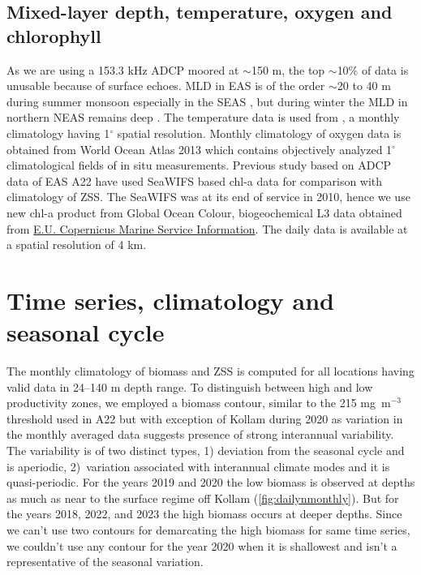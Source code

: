 \documentclass{article}
\begin{document}
	\subsection{Mixed-layer depth, temperature, oxygen and chlorophyll}
	As we are using a 153.3 kHz ADCP moored at $\sim$150 m, the top $\sim$10\% of data is unusable because of surface echoes. MLD in EAS is of the order $\sim$20 to 40 m during summer monsoon \citep{shetye1990hydrography,shankar2002hydrography,sreenivas2008monthly} especially in the SEAS \citep{shenoi2005hydrography}, but during winter the MLD in northern NEAS remains deep \citep{shankar2016inhibition}. The temperature data is used from \citet{chatterjee2012new}, a monthly climatology having 1$^{\circ}$ spatial resolution. Monthly climatology of oxygen data is obtained from World Ocean Atlas 2013 \citep{garcia2013oxygen} which contains objectively analyzed 1$^{\circ}$ climatological fields of in situ measurements. Previous study based on ADCP data of EAS A22 have used SeaWIFS based chl-a data for comparison with climatology of ZSS. The SeaWIFS was at its end of service in 2010, hence we use new chl-a product from Global Ocean Colour, biogeochemical L3 data obtained from  \href{https://doi.org/10.48670/moi-00280}{E.U. Copernicus Marine Service Information}. The daily data is available at a spatial resolution of 4 km. 
	
	\section{Time series, climatology and seasonal cycle}
	The monthly climatology of biomass and ZSS is computed for all locations having valid data in 24--140 m depth range. To distinguish between high and low productivity zones, we employed a biomass contour, similar to the 215 mg~m$^{-3}$ threshold used in A22 but with exception of Kollam during 2020 as variation in the monthly averaged data suggests presence of strong interannual variability. The variability is of two distinct types, 1) deviation from the seasonal cycle and is aperiodic, 2)~variation associated with interannual climate modes and it is quasi-periodic. For the years 2019 and 2020 the low biomass is observed at depths as much as near to the surface regime off Kollam (\cref{fig:dailynmonthly}). But for the years 2018, 2022, and 2023 the high biomass occurs at deeper depths. Since we can't use  two contours for demarcating the high biomass for same time series, we couldn't use any contour for the year 2020 when it is shallowest and isn't a representative of the seasonal variation. 
	
\end{document}

